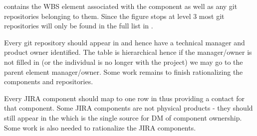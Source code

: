 contains the WBS element associated with the component as well as any git repositories belonging to them.
 Since the figure stops at level 3 most git repositories will only be found in the full list in .

 Every git repository should appear in   and hence have a technical manager and product owner identified. The table is hierarchical hence if the manager/owner is not filled in (or the individual is no longer with the project) we may go to the parent element manager/owner. Some work remains to finish rationalizing the components and repositories.

 Every JIRA component should map to one row in  thus providing a contact for that component.
 Some JIRA components are not physical products - they should still appear in the  which is the single source for DM of component  ownership. Some work is also needed to rationalize the JIRA components.
